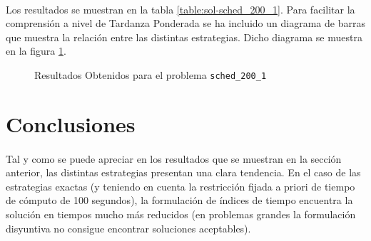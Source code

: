 \documentclass[spanish]{article}
\begin{document}

			\paragraph{}
			Los resultados se muestran en la tabla \ref{table:sol-sched_200_1}. Para facilitar la comprensión a nivel de Tardanza Ponderada se ha incluido un diagrama de barras que muestra la relación entre las distintas estrategias. Dicho diagrama se muestra en la figura \ref{plot:sol-sched_200_1}.

			\begin{figure}
				\begin{center}
				\end{center}
				\caption{Resultados Obtenidos para el problema \texttt{sched\_200\_1}}
				\label{plot:sol-sched_200_1}
			\end{figure}

	\section{Conclusiones}

		\paragraph{}
		Tal y como se puede apreciar en los resultados que se muestran en la sección anterior, las distintas estrategias presentan una clara tendencia. En el caso de las estrategias exactas (y teniendo en cuenta la restricción fijada a priori de tiempo de cómputo de 100 segundos), la formulación de índices de tiempo encuentra la solución en tiempos mucho más reducidos (en problemas grandes la formulación disyuntiva no consigue encontrar soluciones aceptables).
\end{document}
